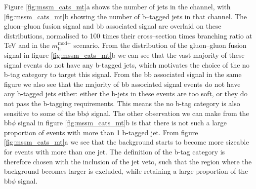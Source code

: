 Figure \ref{fig:mssm_cats_mt}a shows the number of jets 
in the \mutau channel, with \ref{fig:mssm_cats_mt}b showing
the number of b--tagged jets in that channel. The gluon--gluon fusion
signal and bb associated signal are overlaid on these distributions, normalised
to 100 times their cross--section times branching ratio at  TeV and 
 in the $m_{\text{h}}^{\text{mod+}}$ scenario. From the distribution of the
gluon--gluon fusion signal in figure \ref{fig:mssm_cats_mt}b we can 
see that the vast majority of these signal events do not have any b-tagged jets, which
motivates the choice of the no b-tag category to target this signal. From
the bb associated signal in the same figure we also see that the majority of bb associated
signal events do not have any b-tagged jets either: either the b-jets in these events 
are too soft, or they do not pass the b-tagging requirements. This means the no b-tag 
category is also sensitive to some of the bb$\phi$ signal. The other observation we 
can make from the bb$\phi$ signal in figure \ref{fig:mssm_cats_mt}b is that there is not
such a large proportion of events with more than 1 b-tagged jet. From figure \ref{fig:mssm_cats_mt}a
we see that the \ttbar background starts to become more sizeable for events with more than
one jet. The definition of the b-tag category is therefore chosen with the inclusion
of the jet veto, such that the region where the \ttbar background becomes larger is excluded, 
while retaining a large proportion of the bb$\phi$ signal.

